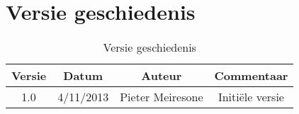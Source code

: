 \chapter{Versie geschiedenis}

\begin{table}[htbp]
	\centering
	\caption{Versie geschiedenis}
	\begin{tabular} {c|c|c|c}
		\textbf{Versie} & \textbf{Datum} 	& \textbf{Auteur} & \textbf{Commentaar} \\
		\hline
		1.0 			& 4/11/2013 		& Pieter Meiresone & Initi\"{e}le versie 
	\end{tabular}
\end{table}